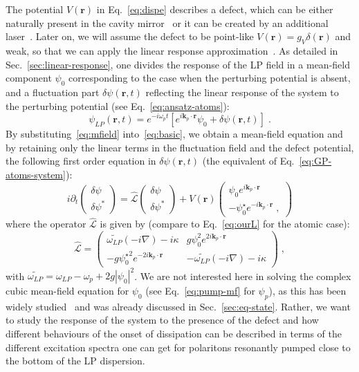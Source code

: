 The potential $V(\bm{r})$ in Eq.~\eqref{eq:dispe} describes a
defect, which can be either naturally present in the cavity
mirror~\cite{Amo_2009} or it can be created by an additional
laser~\cite{Amo_2010}. Later on, we will assume the defect to be
point-like $V(\bm{r})=g_V \delta(\bm{r})$ and weak, so that we can
apply the linear response approximation~\cite{Astrakharchik_2004}.
%
As detailed in Sec.~\ref{sec:linear-response}, one divides the
response of the LP field in a mean-field component $\psi_0$
corresponding to the case when the perturbing potential is absent, and
a fluctuation part $\delta \psi (\bm{r},t)$ reflecting the linear
response of the system to the perturbing potential (see
Eq.~\eqref{eq:ansatz-atoms}):
%
\begin{equation}
  \psi_{LP} (\bm{r},t) = e^{-i \omega_p t} \left[e^{i \bm{k}_p
      \cdot \bm{r}} \psi_0 + \delta \psi (\bm{r},t)\right] \; .
\label{eq:mfield}
\end{equation}
%
By substituting~\eqref{eq:mfield} into~\eqref{eq:basic}, we obtain a
mean-field equation and by retaining only the linear terms in the
fluctuation field and the defect potential, the following first order
equation in $\delta \psi (\bm{r},t)$ (the equivalent of
Eq.~\eqref{eq:GP-atoms-system}):
%
\begin{equation}
  i \partial_t \begin{pmatrix} \delta \psi \\ \delta
    \psi^* \end{pmatrix} = \hat{\mathcal{L}} \begin{pmatrix} \delta
    \psi \\ \delta \psi^* \end{pmatrix} + V(\bm{r}) \begin{pmatrix}
    \psi_0 e^{i \bm{k}_p \cdot \bm{r}} \\ -\psi_0^{\star} e^{-i
      \bm{k}_p \cdot \bm{r}}\; ,
    \end{pmatrix}
\label{eq:linre}
\end{equation}
%
where the operator $\hat{\mathcal{L}}$ is given by (compare to
Eq.~\eqref{eq:ourL} for the atomic case):
%
\begin{equation}
 \hat{\mathcal{L}} = \begin{pmatrix} \widetilde{\omega_{LP}}
   (-i\nabla) - i \kappa & g \psi_0^2 e^{2 i \bm{k}_p \cdot
     \bm{r}} \\ -g {\psi_0^{\star}}^2 e^{-2 i \bm{k}_p \cdot
     \bm{r}}& - \widetilde{\omega_{LP}}(-i \nabla) -
   i\kappa \end{pmatrix}\; ,
\end{equation}
%
with $\widetilde{\omega_{LP}} = \omega_{LP}-\omega_p + 2g
|\psi_0|^2$. We are not interested here in solving the complex cubic
mean-field equation for $\psi_0$ (see Eq.~\eqref{eq:pump-mf} for
$\psi_p$), as this has been widely studied~\cite{9780199228942} and
was already discussed in Sec.~\ref{sec:eq-state}. Rather, we want to
study the response of the system to the presence of the defect and how
different behaviours of the onset of dissipation can be described in
terms of the different excitation spectra one can get for polaritons
resonantly pumped close to the bottom of the LP dispersion.

